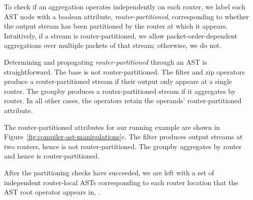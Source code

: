 To check if an aggregation operates independently on each router, we label each
AST node with a boolean attribute, {\em router-partitioned}, corresponding to
whether the output stream has been partitioned by the router at which it
appears. Intuitively, if a stream is router-partitioned, we allow
packet-order-dependent aggregations over multiple packets of that stream;
otherwise, we do not.

Determining and propagating {\em router-partitioned} through an AST is
straightforward. The base {\ct \pktlog} is not router-partitioned. The {\ct
filter} and {\ct zip} operators produce a router-partitioned stream if their
output only appears at a single router. The {\ct groupby} produces a
router-partitioned stream if it aggregates by {\ct router.} In all other cases,
the operators retain the operands' router-partitioned attribute.

The router-partitioned attributes for our running example are shown in
Figure~\ref{fig:compiler-ast-manipulations}c. The {\ct filter} produces output streams at
two routers, hence is not router-partitioned. The {\ct groupby} aggregates by
{\ct router} and hence is router-partitioned.

After the partitioning checks have succeeded, we are left with a set of
independent router-local ASTs corresponding to each router location that the
AST root operator appears in, .

